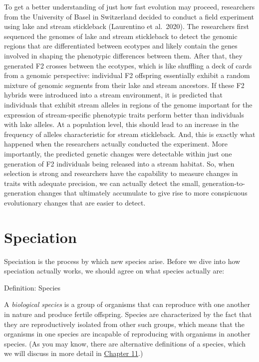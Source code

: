 \documentclass[
]{book}
\begin{document}
To get a better understanding of just how fast evolution may proceed, researchers from the University of Basel in Switzerland decided to conduct a field experiment using lake and stream stickleback (Laurentino et al.~2020). The researchers first sequenced the genomes of lake and stream stickleback to detect the genomic regions that are differentiated between ecotypes and likely contain the genes involved in shaping the phenotypic differences between them. After that, they generated F2 crosses between the ecotypes, which is like shuffling a deck of cards from a genomic perspective: individual F2 offspring essentially exhibit a random mixture of genomic segments from their lake and stream ancestors. If these F2 hybrids were introduced into a stream environment, it is predicted that individuals that exhibit stream alleles in regions of the genome important for the expression of stream-specific phenotypic traits perform better than individuals with lake alleles. At a population level, this should lead to an increase in the frequency of alleles characteristic for stream stickleback. And, this is exactly what happened when the researchers actually conducted the experiment. More importantly, the predicted genetic changes were detectable within just one generation of F2 individuals being released into a stream habitat. So, when selection is strong and researchers have the capability to measure changes in traits with adequate precision, we can actually detect the small, generation-to-generation changes that ultimately accumulate to give rise to more conspicuous evolutionary changes that are easier to detect.

\hypertarget{speciation}{%
\section{Speciation}\label{speciation}}

Speciation is the process by which new species arise. Before we dive into how speciation actually works, we should agree on what species actually are:

Definition: Species

A \emph{biological species} is a group of organisms that can reproduce with one another in nature and produce fertile offspring. Species are characterized by the fact that they are reproductively isolated from other such groups, which means that the organisms in one species are incapable of reproducing with organisms in another species. (As you may know, there are alternative definitions of a species, which we will discuss in more detail in \href{speciation-1.html}{Chapter 11}.)
\end{document}
